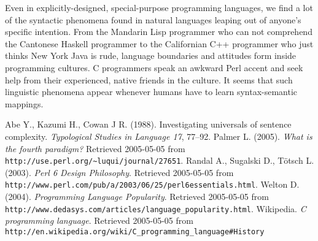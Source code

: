 \documentclass[12pt]{article}
\begin{document}
Even in explicitly-designed, special-purpose programming languages, we
find a lot of the syntactic phenomena found in natural languages leaping
out of anyone's specific intention.  From the Mandarin Lisp programmer
who can not comprehend the Cantonese Haskell programmer to the
Californian C++ programmer who just thinks New York Java is rude,
language boundaries and attitudes form inside programming cultures.  C
programmers speak an awkward Perl accent and seek help from their
experienced, native friends in the culture.  It seems that such
linguistic phenomena appear whenever humans have to learn
syntax-semantic mappings.

\begin{thebibliography}{4in}
 Abe Y., Kazumi H., Cowan J R. (1988).
Investigating universals of sentence complexity.  \textit{Typological
Studies in Language 17}, 77--92.
 Palmer L. (2005).  \textit{What is the fourth
paradigm?}  Retrieved 2005-05-05 from 
\verb+http://use.perl.org/~luqui/journal/27651+.
 Randal A., Sugalski D., T\"otsch
L. (2003).  \textit{Perl 6 Design Philosophy}.  Retrieved 2005-05-05
from \verb+http://www.perl.com/pub/a/2003/06/25/perl6essentials.html+.
 Welton D. (2004). \textit{Programming Language
Popularity}.  Retrieved 2005-05-05 from
\verb+http://www.dedasys.com/articles/language_popularity.html+.
 Wikipedia.  \textit{C programming
language}.  Retrieved 2005-05-05 from 
\verb+http://en.wikipedia.org/wiki/C_programming_language#History+
\end{thebibliography}
\end{document}
